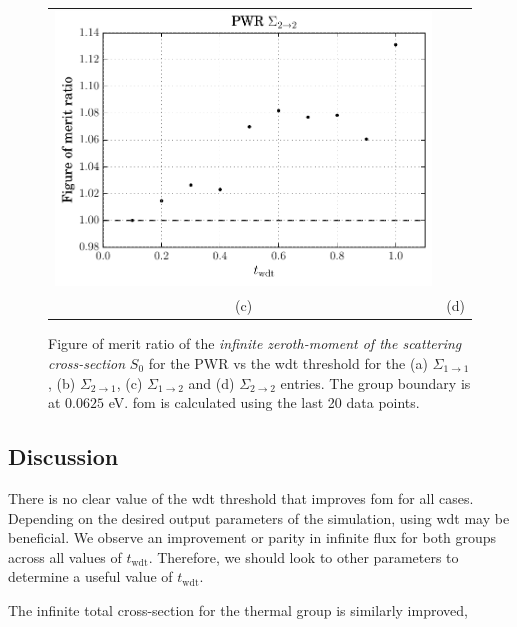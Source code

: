\begin{figure}[hbtp]
\begin{tabular}{cc}
  \includegraphics[scale=0.6]{images/results/pwr_inf_sp0_grp_4} \\
    (c) & (d)
  \end{tabular}
  \caption[Figure of merit ratio of the \textit{infinite zeroth-moment of the
  scattering cross-section} for the PWR]{Figure of merit ratio of the
    \textit{infinite zeroth-moment of the scattering cross-section} $S_0$ for
    the PWR vs the \gls{wdt} threshold for the (a) $\Sigma_{1 \to
      1}$, (b) $\Sigma_{2 \to 1}$, (c) $\Sigma_{1 \to 2}$ and (d)
    $\Sigma_{2 \to 2}$ entries. The group boundary is at $0.0625$ eV. \gls{fom} is
    calculated using the last 20 data points.}
  \label{fig:pwr_inf_sp0}
\end{figure}
\newpage
\subsection{Discussion}
\label{sec:pwr_discussion}

There is no clear value of the \gls{wdt} threshold that improves
\gls{fom} for all cases. Depending on the desired output parameters of
the simulation, using \gls{wdt} may be beneficial. We observe an
improvement or parity in infinite flux for both groups across all values of
$t_\mathrm{wdt}$. Therefore, we should look to other parameters to
determine a useful value of $t_{\mathrm{wdt}}$.

The infinite total cross-section for the thermal group is similarly
improved,

